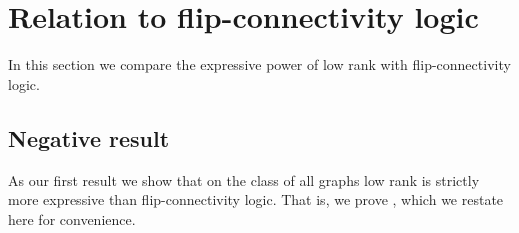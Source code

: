 \section{Relation to flip-connectivity logic}\label{sec:fconn}

In this section we compare the expressive power of low rank \mso with flip-connectivity logic.

\subsection{Negative result}
As our first result we show that on the class of all graphs low rank \mso is strictly more expressive than flip-connectivity logic. That is, we prove , which we restate here for convenience.

\mainFconnNegative*
